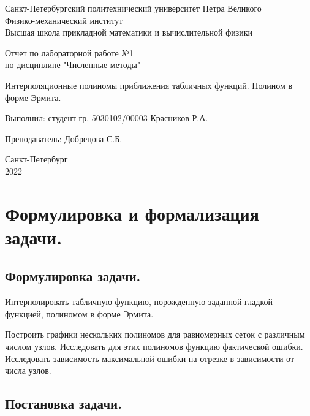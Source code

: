\documentclass[a4paper, 12pt]{article}
\begin{document}
	\begin{titlepage}
		\begin{center}
			Санкт-Петербургский политехнический университет Петра Великого \\ Физико-механический институт \\ Высшая школа прикладной математики и вычислительной физики
		\end{center}
		\vspace{10em}
		\begin{center}
			\Large Отчет по лабораторной работе №1 \\ по дисциплине "Численные методы"
		\end{center}
		\vspace{1em}
		\begin{center}
			\Huge Интерполяционные полиномы приближения табличных функций. Полином в форме Эрмита.
		\end{center}
		\vspace{15em}
		{\Large 
			
			Выполнил: студент гр. 5030102/00003 Красников Р.А.
			\vspace{1em}
			
			Преподаватель: Добрецова С.Б.}
		\vspace{\fill}
		\begin{center}
			Санкт-Петербург \\ 2022
		\end{center}
	\end{titlepage}
	\newpage
	
	\section{Формулировка и формализация задачи.}
	
	\subsection{Формулировка задачи.}
	
	Интерполировать табличную функцию, порожденную заданной гладкой функцией, полиномом в форме Эрмита.
	
	Построить графики нескольких полиномов для равномерных сеток с различным числом узлов. Исследовать для этих полиномов функцию фактической ошибки. Исследовать зависимость максимальной ошибки на отрезке в зависимости от числа узлов.
	
	\subsection{Постановка задачи.}
	
\end{document}
